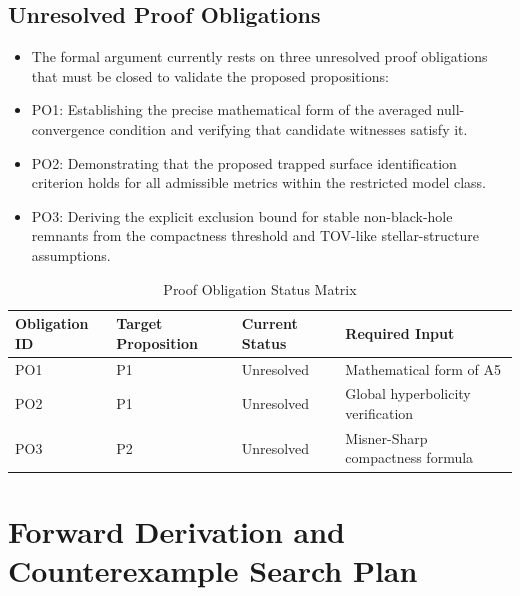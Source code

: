 \documentclass[conference]{IEEEtran}
\begin{document}
\subsection{Unresolved Proof Obligations}
\begin{itemize}
\item The formal argument currently rests on three unresolved proof obligations that must be closed to validate the proposed propositions:
\item PO1: Establishing the precise mathematical form of the averaged null-convergence condition and verifying that candidate witnesses satisfy it.
\item PO2: Demonstrating that the proposed trapped surface identification criterion holds for all admissible metrics within the restricted model class.
\item PO3: Deriving the explicit exclusion bound for stable non-black-hole remnants from the compactness threshold and TOV-like stellar-structure assumptions.
\end{itemize}

\begin{table}[htbp]
\centering
\footnotesize
\setlength{\tabcolsep}{3pt}
\renewcommand{\arraystretch}{1.12}
\caption{Proof Obligation Status Matrix}
\label{tab:definitions-and-propositions-table-decisions}
\begin{tabular}{|p{}|p{}|p{}|p{}|}
\hline
Obligation ID & Target Proposition & Current Status & Required Input \\\hline
PO1 & P1 & Unresolved & Mathematical form of A5 \\\hline
PO2 & P1 & Unresolved & Global hyperbolicity verification \\\hline
PO3 & P2 & Unresolved & Misner-Sharp compactness formula \\\hline
\end{tabular}
\end{table}

\section{Forward Derivation and Counterexample Search Plan}
\end{document}
